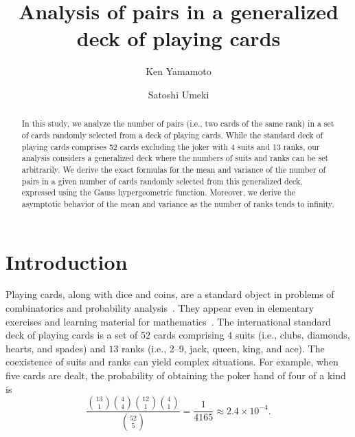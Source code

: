 \documentclass[pre, amsmath, floatfix]{revtex4-2}
\theoremstyle{plain}
\theoremstyle{definition}
\theoremstyle{remark}
\begin{document}
\title{Analysis of pairs in a generalized deck of playing cards}

\author{Ken Yamamoto}
\author{Satoshi Umeki}

\begin{abstract}
In this study, we analyze the number of pairs (i.e., two cards of the same rank) in a set of cards randomly selected from a deck of playing cards.
While the standard deck of playing cards comprises 52 cards excluding the joker with 4 suits and 13 ranks, our analysis considers a generalized deck where the numbers of suits and ranks can be set arbitrarily.
We derive the exact formulas for the mean and variance of the number of pairs in a given number of cards randomly selected from this generalized deck, expressed using the Gauss hypergeometric function.
Moreover, we derive the asymptotic behavior of the mean and variance as the number of ranks tends to infinity.
\end{abstract}

\maketitle

\section{Introduction}
Playing cards, along with dice and coins, are a standard object in problems of combinatorics and probability analysis~\cite{Epstein}.
They appear even in elementary exercises and learning material for mathematics~\cite{Knapp}.
The international standard deck of playing cards is a set of $52$ cards comprising $4$ suits (i.e., clubs, diamonds, hearts, and spades) and $13$ ranks (i.e., 2--9, jack, queen, king, and ace).
The coexistence of suits and ranks can yield complex situations.
For example, when five cards are dealt, the probability of obtaining the poker hand of four of a kind is~\cite{Epstein}
\[
\frac{\binom{13}{1}\binom{4}{4}\binom{12}{1}\binom{4}{1}}{\binom{52}{5}}=\frac{1}{4165}\approx2.4\times10^{-4}.
\]
\end{document}
